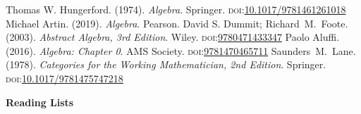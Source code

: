 \documentclass[12pt, a3paper, openany]{book}
\begin{document}
\tableofcontents

\vspace{1ex}

\begin{thebibliography}{}
 Thomas W. Hungerford. (1974). \emph{Algebra}. Springer. \textsc{doi}:\href{https://doi.org/10.1007/978-1-4612-6101-8}{10.1017/9781461261018}
 Michael Artin. (2019). \emph{Algebra}. Pearson. 
{\small
  David S. Dummit; Richard~M.~Foote. (2003). \emph{Abstract Algebra, 3rd Edition}. Wiley. \textsc{doi}:\href{https://www.wiley.com/en-jp/Abstract+Algebra%2C+3rd+Edition-p-9780471433347}{9780471433347}
 Paolo Aluffi. (2016). \emph{Algebra: Chapter 0}. AMS Society. \textsc{doi}:\href{https://bookstore.ams.org/view?ProductCode=GSM/104}{9781470465711}
 Saunders~M.~Lane. (1978). \emph{Categories for the Working Mathematician, 2nd Edition}. Springer. \textsc{doi}:\href{https://doi.org/10.1007/978-1-4757-4721-8}{10.1017/9781475747218}
}
\end{thebibliography}
\vspace{5ex}
\begin{flushleft}
    \Huge\textbf{Reading Lists}
\end{flushleft}
\end{document}
